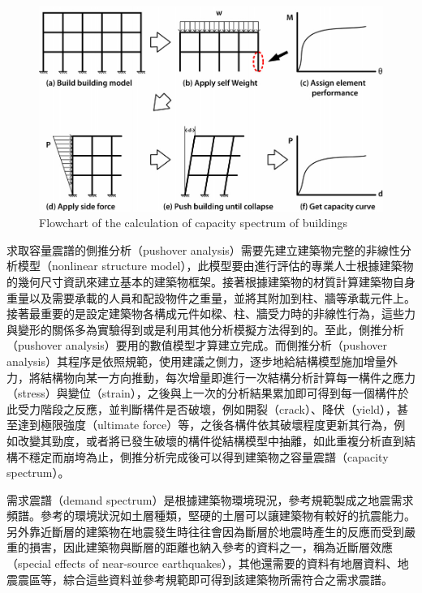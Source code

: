 \begin{figure}[hbtp]
  \begin{center}
    \includegraphics[width=1.0\textwidth]{figures/capacity-curve.png}
    \caption{Flowchart of the calculation of capacity spectrum of buildings} 
    \label{fig:capacity-curve}
  \end{center}
\end{figure}

求取容量震譜的側推分析（pushover analysis）需要先建立建築物完整的非線性分析模型（nonlinear structure model），此模型要由進行評估的專業人士根據建築物的幾何尺寸資訊來建立基本的建築物框架。接著根據建築物的材質計算建築物自身重量以及需要承載的人員和配設物件之重量，並將其附加到柱、牆等承載元件上。接著最重要的是設定建築物各構成元件如樑、柱、牆受力時的非線性行為，這些力與變形的關係多為實驗得到或是利用其他分析模擬方法得到的。至此，側推分析（pushover analysis）要用的數值模型才算建立完成。而側推分析（pushover analysis）其程序是依照規範，使用建議之側力，逐步地給結構模型施加增量外力，將結構物向某一方向推動，每次增量即進行一次結構分析計算每一構件之應力（stress）與變位（strain），之後與上一次的分析結果累加即可得到每一個構件於此受力階段之反應，並判斷構件是否破壞，例如開裂（crack）、降伏（yield），甚至達到極限強度（ultimate force）等，之後各構件依其破壞程度更新其行為，例如改變其勁度，或者將已發生破壞的構件從結構模型中抽離，如此重複分析直到結構不穩定而崩垮為止，側推分析完成後可以得到建築物之容量震譜（capacity spectrum）。

需求震譜（demand spectrum）是根據建築物環境現況，參考規範製成之地震需求頻譜。參考的環境狀況如土層種類，堅硬的土層可以讓建築物有較好的抗震能力。另外靠近斷層的建築物在地震發生時往往會因為斷層於地震時產生的反應而受到嚴重的損害，因此建築物與斷層的距離也納入參考的資料之一，稱為近斷層效應（special effects of near-source earthquakes），其他還需要的資料有地層資料、地震震區等，綜合這些資料並參考規範即可得到該建築物所需符合之需求震譜。

